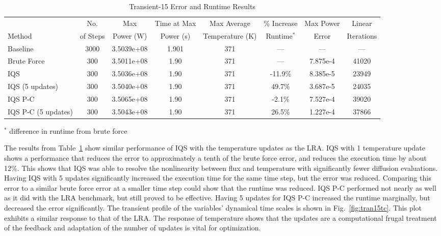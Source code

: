\documentclass{anstrans}
\newcommand{\fig}[1]{Fig.~\ref{#1}}                      %
\newcommand{\tbl}[1]{Table~\ref{#1}}                     %
\begin{document}
\begin{table}[htb]
\begin{center}
\begin{tabular}{|l|ccccccc|}
\hline
 & No.	& Max &	Time at Max &	Max Average &	\% Increase &	Max Power & Linear	\\
Method & of Steps &	Power (W) &	Power (s) &	Temperature (K) & Runtime$^*$ & Error & Iterations \\
\hline
Baseline 			& 3000 	& 3.5039e+08 & 1.901 & 371 &	---		&	---		 & ---		\\
Brute Force 		& 300 	& 3.5011e+08 & 1.90  & 371 &	---		&	7.875e-4 & 41020	\\
IQS 				& 300	& 3.5036e+08 & 1.90  & 371 & -11.9\%	&	8.385e-5 & 23949	\\
IQS (5 updates) 	& 300 	& 3.5040e+08 & 1.90  & 371 &  49.7\%	&	3.687e-5 & 24035	\\
IQS P-C 			& 300 	& 3.5065e+08 & 1.90  & 371 &  -2.1\%	&	7.527e-4 & 39020	\\
IQS P-C (5 updates) & 300 	& 3.5043e+08 & 1.90  & 371 &  26.5\%	&	1.227e-4 & 37866	\\
\hline
\end{tabular}
\end{center}
\vspace{-3mm}
$^*$ difference in runtime from brute force 
\caption{Transient-15 Error and Runtime Results}
\label{tab:tran15}
\end{table}

The results from \tbl{tab:tran15} show similar performance of IQS with the temperature updates as the LRA.  IQS with 1 temperature update shows a performance that reduces the error to approximately a tenth of the brute force error, and reduces the execution time by about 12\%.  This shows that IQS was able to resolve the nonlinearity between flux and temperature with significantly fewer diffusion evaluations.  Having IQS with 5 updates significantly increased the execution time for the same time step, but the error was reduced.  Comparing this error to a similar brute force error at a smaller time step could show that the runtime was reduced. IQS P-C performed not nearly as well as it did with the LRA benchmark, but still proved to be effective.  Having 5 updates for IQS P-C increased the runtime marginally, but decreased the error significantly.  The transient profile of the variables' dynamical time scales is shown in \fig{fig:tran15tc}.  This plot exhibits a similar response to that of the LRA. The response of temperature shows that the updates are a computational frugal treatment of the feedback and adaptation of the number of updates is vital for optimization. \\
\end{document}
